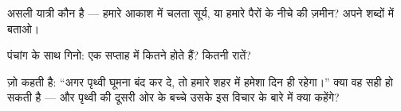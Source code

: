 \begin{exercise}[$\star$]\label{exo:g1:day-and-night:7}
असली यात्री कौन है --- हमारे आकाश में चलता सूर्य, या हमारे पैरों के
नीचे की ज़मीन? अपने शब्दों में बताओ।
\end{exercise}

\begin{exercise}[$\star$]\label{exo:g1:day-and-night:8}
पंचांग के साथ गिनो: एक सप्ताह में कितने  होते हैं? कितनी
रातें?
\end{exercise}

\begin{exercise}[$\star\star$]\label{exo:g1:day-and-night:9}
ज़ो कहती है: ``अगर पृथ्वी घूमना बंद कर दे, तो हमारे शहर में हमेशा दिन
ही रहेगा।'' क्या वह सही हो सकती है --- और पृथ्वी की दूसरी ओर के बच्चे
उसके इस विचार के बारे में क्या कहेंगे?
\end{exercise}
